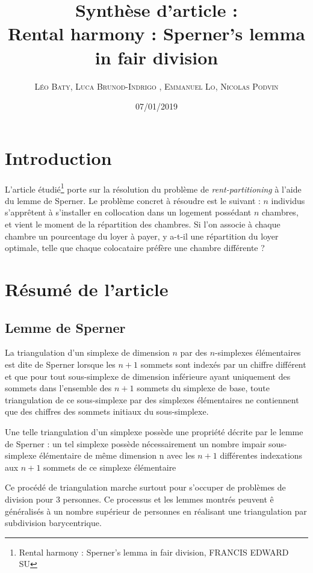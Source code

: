 \documentclass[12pt,twoside,a4paper]{article}
\title{\textbf{Synth\`ese d'article} :\\ Rental harmony : Sperner's lemma in fair division}
\author{\textsc{L\'eo Baty, Luca Brunod-Indrigo , Emmanuel Lo, Nicolas Podvin}}
\date{07/01/2019}
\begin{document}
\maketitle


\tableofcontents

\section{Introduction}

L'article \'etudi\'e\footnote{Rental harmony : Sperner's lemma in fair division, FRANCIS EDWARD SU} porte sur la r\'esolution du probl\`eme de \textit{rent-partitioning} \`a l'aide du lemme de Sperner. Le probl\`eme concret \`a r\'esoudre est le suivant : $n$ individus s'appr\^{e}tent \`a s'installer en collocation dans un logement poss\'edant $n$ chambres, et vient le moment de la r\'epartition des chambres. Si l'on associe \`a chaque chambre un pourcentage du loyer \`a payer, y a-t-il une r\'epartition du loyer optimale, telle que chaque colocataire pr\'ef\`ere une chambre diff\'erente ? 

\section{R\'esum\'e de l'article}

\subsection{Lemme de Sperner}

La triangulation d'un simplexe de dimension $n$ par des $n$-simplexes \'el\'ementaires est dite de Sperner lorsque les $n+1$ sommets sont index\'es par un chiffre diff\'erent et que pour tout sous-simplexe de dimension inférieure ayant uniquement des sommets dans l'ensemble des $n+1$ sommets du simplexe de base, toute triangulation de ce sous-simplexe par des simplexes \'el\'ementaires ne contiennent que des chiffres des sommets initiaux du sous-simplexe.

Une telle triangulation d'un simplexe poss\`ede une propriété d\'ecrite par le lemme de Sperner : un tel simplexe possède n\'ecessairement un nombre impair sous-simplexe élémentaire de même dimension n avec les $n+1$ différentes indexations aux $n+1$ sommets de ce simplexe \'el\'ementaire

Ce proc\'ed\'e de triangulation marche surtout pour s'occuper de probl\`emes de division pour 3 personnes. Ce processus et les lemmes montr\'es peuvent \^{e} g\'en\'eralis\'es \`a un nombre sup\'erieur de personnes en r\'ealisant une triangulation par subdivision barycentrique.
\end{document}

